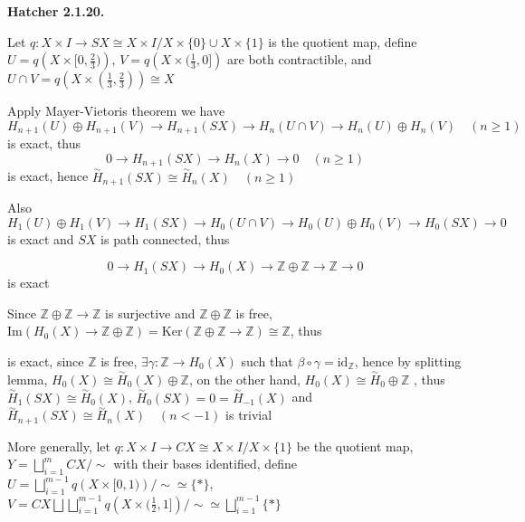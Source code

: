 \documentclass[../main.tex]{subfiles}
\begin{document}
\textbf{Hatcher 2.1.20.} \par
Let $q:X\times I\rightarrow SX\cong X\times I/X\times\{0\}\cup X\times\{1\}$ is the quotient map, define $U=q\left(X\times[0,\frac{2}{3})\right)$, $V=q\left(X\times(\frac{1}{3},0]\right)$ are both contractible, and $U\cap V=q\left(X\times(\frac{1}{3},\frac{2}{3})\right)\cong X$ \par
Apply Mayer-Vietoris theorem we have
\[
H_{n+1}(U)\oplus H_{n+1}(V)\rightarrow H_{n+1}(SX)\rightarrow H_n(U\cap V)\rightarrow H_n(U)\oplus H_n(V) \quad (n\geq 1)
\]
is exact, thus
\[
0\rightarrow H_{n+1}(SX)\rightarrow H_n(X)\rightarrow 0 \quad (n\geq 1)
\]
is exact, hence $\overset{\sim}{H}_{n+1}(SX)\cong\overset{\sim}{H}_n(X) \quad (n\geq 1)$ \par
Also
\[
H_1(U)\oplus H_1(V)\rightarrow H_1(SX)\rightarrow H_0(U\cap V)\rightarrow H_0(U)\oplus H_0(V)\rightarrow H_0(SX)\rightarrow 0
\]
is exact and $SX$ is path connected, thus \par
\[
0\rightarrow H_1(SX)\rightarrow H_0(X)\rightarrow \mathbb{Z}\oplus \mathbb{Z}\rightarrow \mathbb{Z}\rightarrow 0
\]
is exact \par
Since $\mathbb{Z}\oplus \mathbb{Z}\rightarrow \mathbb{Z}$ is surjective and $\mathbb{Z}\oplus \mathbb{Z}$ is free, $\mathrm{Im}\left(H_0(X)\rightarrow \mathbb{Z}\oplus \mathbb{Z}\right)=\mathrm{Ker}\left(\mathbb{Z}\oplus \mathbb{Z}\rightarrow \mathbb{Z}\right)\cong\mathbb{Z}$, thus
\begin{center}
\end{center}
is exact, since $\mathbb{Z}$ is free, $\exists\gamma:\mathbb{Z}\rightarrow H_0(X)$ such that $\beta\circ\gamma=\mathrm{id}_\mathbb{Z}$, hence by splitting lemma, $H_0(X)\cong\overset{\sim}{H}_0(X)\oplus\mathbb{Z}$, on the other hand, $H_0(X)\cong\overset{\sim}{H}_0\oplus\mathbb{Z}$ , thus $\overset{\sim}{H}_1(SX)\cong\overset{\sim}{H}_0(X)$, $\overset{\sim}{H}_0(SX)=0=\overset{\sim}{H}_{-1}(X)$ and $\overset{\sim}{H}_{n+1}(SX)\cong\overset{\sim}{H}_n(X) \quad (n<-1)$ is trivial \par
More generally, let $q:X\times I\rightarrow CX\cong X\times I/X\times\{1\}$ be the quotient map, $\displaystyle Y=\bigsqcup_{i=1}^mCX \Big/\sim$ with their bases identified, define $\displaystyle U=\bigsqcup_{i=1}^{m-1}q\left(X\times[0,1)\right) \Big/\sim\simeq\{*\}$, $\displaystyle V=CX\bigsqcup\bigsqcup_{i=1}^{m-1}q\left(X\times(\frac{1}{2},1]\right) \Big/\sim\simeq\bigsqcup_{i=1}^{m-1}\{*\}$ \par
\end{document}
